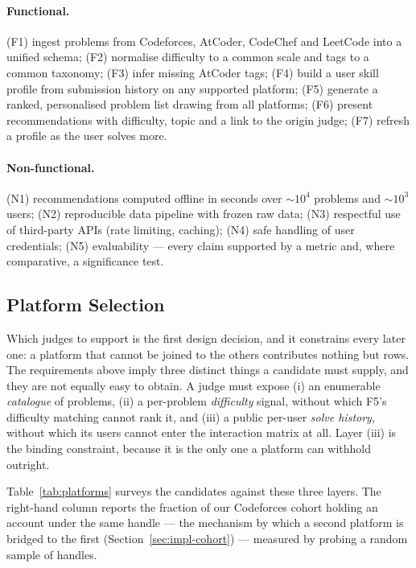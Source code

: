 \documentclass[12pt,a4paper]{article}
\begin{document}
\paragraph{Functional.} (F1) ingest problems from Codeforces, AtCoder, CodeChef and
LeetCode into a unified schema; (F2) normalise difficulty to a common scale and tags to a common
taxonomy; (F3) infer missing AtCoder tags; (F4) build a user skill profile from
submission history on any supported platform; (F5) generate a ranked, personalised
problem list drawing from all platforms; (F6) present recommendations with difficulty,
topic and a link to the origin judge; (F7) refresh a profile as the user solves more.

\paragraph{Non-functional.} (N1) recommendations computed offline in seconds over
$\sim$$10^4$ problems and $\sim$$10^3$ users; (N2) reproducible data pipeline with frozen
raw data; (N3) respectful use of third-party APIs (rate limiting, caching); (N4) safe
handling of user credentials; (N5) evaluability --- every claim supported by a metric
and, where comparative, a significance test.

\subsection{Platform Selection}
\label{sec:design-platforms}
Which judges to support is the first design decision, and it constrains every later
one: a platform that cannot be joined to the others contributes nothing but rows. The
requirements above imply three distinct things a candidate must supply, and they are not
equally easy to obtain. A judge must expose (i) an enumerable \emph{catalogue} of
problems, (ii) a per-problem \emph{difficulty} signal, without which F5's difficulty
matching cannot rank it, and (iii) a public per-user \emph{solve history}, without which
its users cannot enter the interaction matrix at all. Layer (iii) is the binding
constraint, because it is the only one a platform can withhold outright.

Table~\ref{tab:platforms} surveys the candidates against these three layers. The
right-hand column reports the fraction of our Codeforces cohort holding an account under
the same handle --- the mechanism by which a second platform is bridged to the first
(Section~\ref{sec:impl-cohort}) --- measured by probing a random sample of handles.
\end{document}
